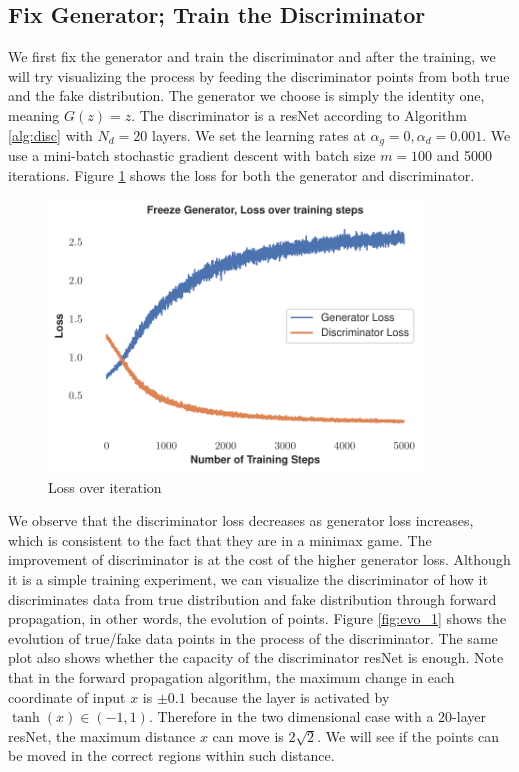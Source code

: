 \subsection{Fix Generator; Train the Discriminator}
\label{sec: 1}
We first fix the generator and train the discriminator and after the training, we will try visualizing the process by feeding the discriminator points from both true and the fake distribution. The generator we choose is simply the identity one, meaning $G(z) = z$. The discriminator is a resNet according to Algorithm \ref{alg:disc} with $N_d=20$ layers. We set the learning rates at $\alpha_g = 0, \alpha_d = 0.001$. We use a mini-batch stochastic gradient descent with batch size $m = 100$ and 5000 iterations. Figure \ref{fig:gen_freeze_loss} shows the loss for both the generator and discriminator.
\begin{figure}[H]
    \centering
\includegraphics[width = 10cm]{Freeze_generator.pdf}
\caption{Loss over iteration}
    \label{fig:gen_freeze_loss}
\end{figure}
We observe that the discriminator loss decreases as generator loss increases, which is consistent to the fact that they are in a minimax game. The improvement of discriminator is at the cost of the higher generator loss. Although it is a simple training experiment, we can visualize the discriminator of how it discriminates data from true distribution and fake distribution through forward propagation, in other words, the evolution of points. Figure \ref{fig:evo_1} shows the evolution of true/fake data points in the process of the discriminator. The same plot also shows whether the capacity of the discriminator resNet is enough. Note that in the forward propagation algorithm, the maximum change in each coordinate of input $x$ is $\pm 0.1$ because the layer is activated by  $\tanh(x)\in (-1,1)$. Therefore in the two dimensional case with a 20-layer resNet, the maximum distance $x$ can move is $2\sqrt{2}$. We will see if the points can be moved in the correct regions within such distance.
